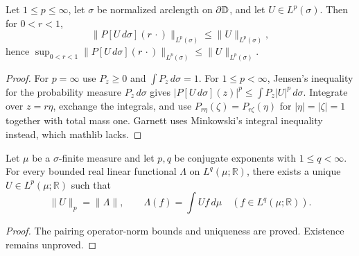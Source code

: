 \begin{lemma}
  \label{eq:I_3_5}
  \leanok
  Let $1\le p\le\infty$, let $\sigma$ be normalized arclength on $\partial\mathbb{D}$,
  and let $U\in L^p(\sigma)$. Then for $0<r<1$,
  \[
    \|P[U\,d\sigma](r\,\cdot)\|_{L^p(\sigma)}\le\|U\|_{L^p(\sigma)},
  \]
  hence $\sup_{0<r<1}\|P[U\,d\sigma](r\,\cdot)\|_{L^p(\sigma)}
  \le\|U\|_{L^p(\sigma)}$.
  \begin{proof}
    \leanok
    For $p=\infty$ use $P_z\ge0$ and $\int P_z\,d\sigma=1$. For
    $1\le p<\infty$, Jensen's inequality for the probability measure
    $P_z\,d\sigma$ gives $|P[U\,d\sigma](z)|^p\le\int P_z|U|^p\,d\sigma$.
    Integrate over $z=r\eta$, exchange the integrals, and use
    $P_{r\eta}(\zeta)=P_{r\zeta}(\eta)$ for $|\eta|=|\zeta|=1$ together with
    total mass one. Garnett uses Minkowski's integral inequality instead,
    which mathlib lacks.
  \end{proof}
\end{lemma}

\begin{theorem}
  \label{thm:lp_duality}
  \leanok
  Let $\mu$ be a $\sigma$-finite measure and let $p,q$ be conjugate exponents with
  $1\le q<\infty$. For every bounded real linear functional
  $\Lambda$ on $L^q(\mu;\mathbb R)$, there exists a unique $U\in L^p(\mu;\mathbb R)$ such that
  \[
    \|U\|_p=\|\Lambda\|,
    \qquad \Lambda(f)=\int Uf\,d\mu\quad(f\in L^q(\mu;\mathbb R)).
  \]
  \begin{proof}
    \notready
    The pairing operator-norm bounds and uniqueness are proved. Existence remains unproved.
  \end{proof}
\end{theorem}

